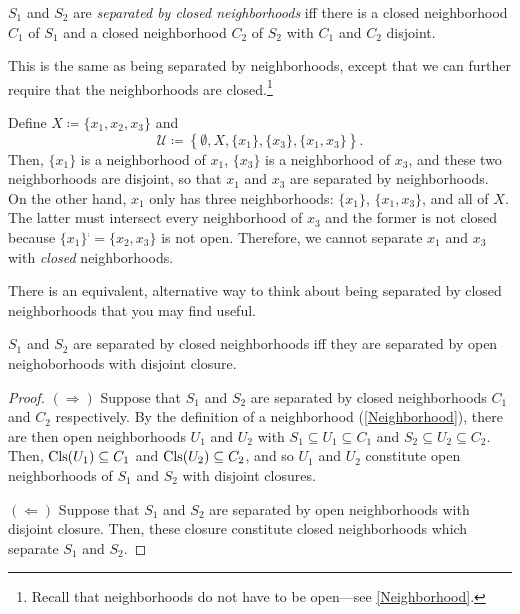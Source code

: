 \begin{dfn}\label{SeparatedByClosedNeighborhoods}
$S_1$ and $S_2$ are \emph{separated by closed neighborhoods} iff there is a closed neighborhood $C_1$ of $S_1$ and a closed neighborhood $C_2$ of $S_2$ with $C_1$ and $C_2$ disjoint.
\begin{rmk}
This is the same as being separated by neighborhoods, except that we can further require that the neighborhoods are closed.\footnote{Recall that neighborhoods do not have to be open---see \cref{Neighborhood}.}
\end{rmk}
\end{dfn}
\begin{exm}\label{exm4.5.11}
Define $X\coloneqq \{ x_1,x_2,x_3\}$ and
\begin{equation}
\mathcal{U}\coloneqq \left\{ \emptyset ,X,\{ x_1\} ,\{ x_3\} ,\{ x_1,x_3\} \right\} .
\end{equation}
Then, $\{ x_1\}$ is a neighborhood of $x_1$, $\{ x_3\}$ is a neighborhood of $x_3$, and these two neighborhoods are disjoint, so that $x_1$ and $x_3$ are separated by neighborhoods.  On the other hand, $x_1$ only has three neighborhoods:  $\{ x_1\}$, $\{ x_1,x_3\}$, and all of $X$.  The latter must intersect every neighborhood of $x_3$ and the former is not closed because $\{ x_1\} ^{\comp}=\{ x_2,x_3\}$ is not open.  Therefore, we cannot separate $x_1$ and $x_3$ with \emph{closed} neighborhoods.
\end{exm}
There is an equivalent, alternative way to think about being separated by closed neighborhoods that you may find useful.
\begin{prp}\label{prp4.5.13}
$S_1$ and $S_2$ are separated by closed neighborhoods iff they are separated by open neighoborhoods with disjoint closure.
\begin{proof}
$(\Rightarrow )$ Suppose that $S_1$ and $S_2$ are separated by closed neighborhoods $C_1$ and $C_2$ respectively.  By the definition of a neighborhood (\cref{Neighborhood}), there are then open neighborhoods $U_1$ and $U_2$ with $S_1\subseteq U_1\subseteq C_1$ and $S_2\subseteq U_2\subseteq C_2$.  Then, $\operatorname{Cls} (U_1)\subseteq C_1$ and $\operatorname{Cls} (U_2)\subseteq C_2$, and so $U_1$ and $U_2$ constitute open neighborhoods of $S_1$ and $S_2$ with disjoint closures.

\blankline
\noindent
$(\Leftarrow )$ Suppose that $S_1$ and $S_2$ are separated by open neighborhoods with disjoint closure.  Then, these closure constitute closed neighborhoods which separate $S_1$ and $S_2$.
\end{proof}
\end{prp}
